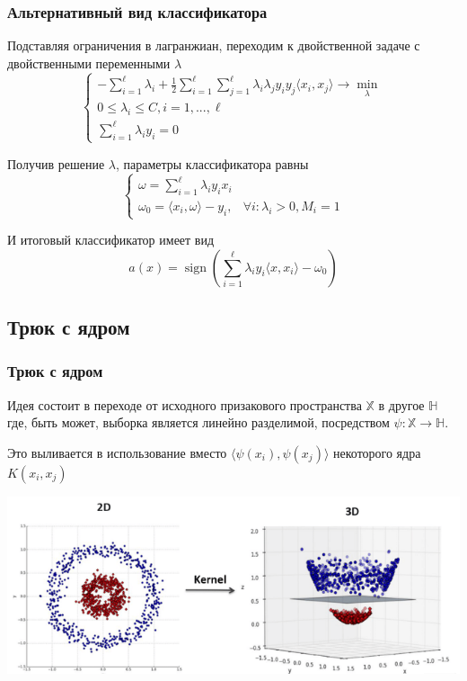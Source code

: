 \documentclass{beamer}
\DeclareMathOperator{\sign}{sign}
\begin{document}
	\begin{frame}
		\frametitle{Альтернативный вид классификатора}
		Подставляя ограничения в лагранжиан, переходим к двойственной задаче с двойственными переменными $\lambda$
		\[
		\begin{cases}
			- \sum_{i=1}^{\ell} \lambda_i + 
			\frac{1}{2} \sum_{i=1}^{\ell} \sum_{j=1}^{\ell}
			\lambda_i \lambda_j y_i y_j \langle x_i, x_j \rangle
			\rightarrow \min_{\lambda} \\
			
			0 \le \lambda_i \le C, i=1, ..., \ell \\
			
			\sum_{i=1}^{\ell} \lambda_i y_i = 0
		\end{cases}
		\]
		
		 Получив решение $\lambda$, параметры классификатора равны
		\[
		\begin{cases}
			\omega = \sum_{i=1}^{\ell} \lambda_i y_i x_i \\
			\omega_0 = \langle x_i, \omega \rangle - y_i, & \forall i: \lambda_i > 0, M_i = 1
		\end{cases}
		\]
		
		И итоговый классификатор имеет вид
		\[
		a(x) = \sign \left( \sum_{i=1}^{\ell} \lambda_i y_i \langle x, x_i \rangle - \omega_0 \right)
		\]
	\end{frame}
	
	\subsection{Трюк с ядром}
	
	\begin{frame}
		\frametitle{Трюк с ядром}
		Идея состоит в переходе от исходного призакового пространства $\mathbb{X}$ в другое $\mathbb{H}$ где, быть может, выборка является линейно разделимой, посредством $\psi: \mathbb{X} \rightarrow \mathbb{H}$. 
		
		Это выливается в использование вместо $\langle \psi (x_i), \psi (x_j) \rangle$ некоторого ядра $K(x_i, x_j)$
		
		\includegraphics[width=1\textwidth]{img/kernel_trick.png}
	\end{frame}
	
\end{document}
